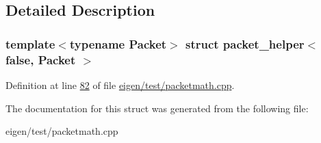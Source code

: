 \subsection{Detailed Description}
\subsubsection*{template$<$typename Packet$>$\newline
struct packet\+\_\+helper$<$ false, Packet $>$}



Definition at line \hyperlink{eigen_2test_2packetmath_8cpp_source_l00082}{82} of file \hyperlink{eigen_2test_2packetmath_8cpp_source}{eigen/test/packetmath.\+cpp}.



The documentation for this struct was generated from the following file\+:\begin{DoxyCompactItemize}
\item 
eigen/test/packetmath.\+cpp\end{DoxyCompactItemize}
